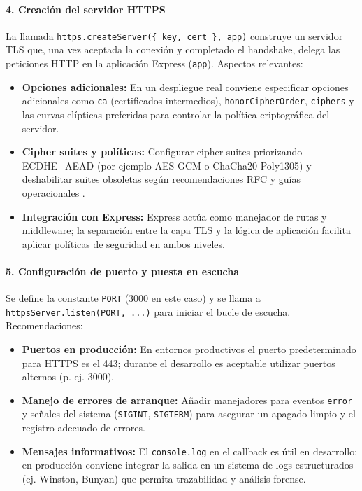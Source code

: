 \paragraph{4. Creación del servidor HTTPS}
La llamada \texttt{https.createServer(\{ key, cert \}, app)} construye un servidor TLS que, una vez aceptada la conexión y completado el handshake, delega las peticiones HTTP en la aplicación Express (\texttt{app}). Aspectos relevantes:
\begin{itemize}
  \item \textbf{Opciones adicionales:} En un despliegue real conviene especificar opciones adicionales como \texttt{ca} (certificados intermedios), \texttt{honorCipherOrder}, \texttt{ciphers} y las curvas elípticas preferidas para controlar la política criptográfica del servidor.
  \item \textbf{Cipher suites y políticas:} Configurar cipher suites priorizando ECDHE+AEAD (por ejemplo AES-GCM o ChaCha20-Poly1305) y deshabilitar suites obsoletas según recomendaciones RFC y guías operacionales \cite{rfc8446, rfc7525}.
  \item \textbf{Integración con Express:} Express actúa como manejador de rutas y middleware; la separación entre la capa TLS y la lógica de aplicación facilita aplicar políticas de seguridad en ambos niveles.
\end{itemize}

\paragraph{5. Configuración de puerto y puesta en escucha}
Se define la constante \texttt{PORT} (3000 en este caso) y se llama a \texttt{httpsServer.listen(PORT, ...)} para iniciar el bucle de escucha. Recomendaciones:
\begin{itemize}
  \item \textbf{Puertos en producción:} En entornos productivos el puerto predeterminado para HTTPS es el 443; durante el desarrollo es aceptable utilizar puertos alternos (p. ej. 3000).
  \item \textbf{Manejo de errores de arranque:} Añadir manejadores para eventos \texttt{error} y señales del sistema (\texttt{SIGINT}, \texttt{SIGTERM}) para asegurar un apagado limpio y el registro adecuado de errores.
  \item \textbf{Mensajes informativos:} El \texttt{console.log} en el callback es útil en desarrollo; en producción conviene integrar la salida en un sistema de logs estructurados (ej. Winston, Bunyan) que permita trazabilidad y análisis forense.
\end{itemize}

